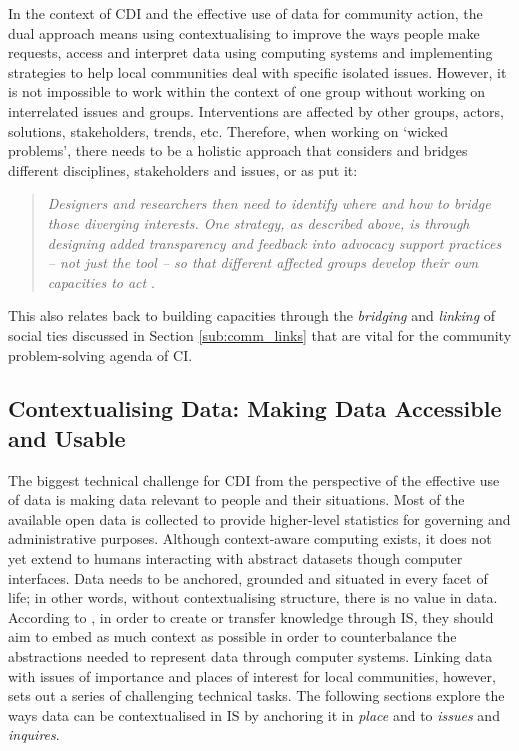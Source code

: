 In the context of CDI and the effective use of data for community action, the dual approach means using contextualising to improve the ways people make requests, access and interpret data using computing systems and implementing strategies to help local communities deal with specific isolated issues. However, it is not impossible to work within the context of one group without working on interrelated issues and groups. Interventions are affected by other groups, actors, solutions, stakeholders, trends, etc. Therefore, when working on `wicked problems', there needs to be a holistic approach that considers and bridges different disciplines, stakeholders and issues, or as \citet{asad_tap_2017} put it: 
\begin{quote}
    \textit{Designers and researchers then need to identify where and how to bridge those diverging interests. One strategy, as described above, is through designing added transparency and feedback into advocacy support practices -- not just the tool -- so that different affected groups develop their own capacities to act} \citet{asad_tap_2017}. 
\end{quote}
This also relates back to building capacities through the \textit{bridging} and \textit{linking} of social ties discussed in Section \ref{sub:comm_links} that are vital for the community problem-solving agenda of CI.

\subsection[Contextualising Data]{Contextualising Data: Making Data Accessible and Usable}
The biggest technical challenge for CDI from the perspective of the effective use of data is making data relevant to people and their situations. Most of the available open data is collected to provide higher-level statistics for governing and administrative purposes. Although context-aware computing exists, it does not yet extend to humans interacting with abstract datasets though computer interfaces. Data needs to be anchored, grounded and situated in every facet of life; in other words, without contextualising structure, there is no value in data. According to \cite{hakken_social_2003}, in order to create or transfer knowledge through IS, they should aim to embed as much context as possible in order to counterbalance the abstractions needed to represent data through computer systems. Linking data with issues of importance and places of interest for local communities, however, sets out a series of challenging technical tasks. The following sections explore the ways data can be contextualised in IS by anchoring it in \textit{place} and to \textit{issues} and \textit{inquires}.

